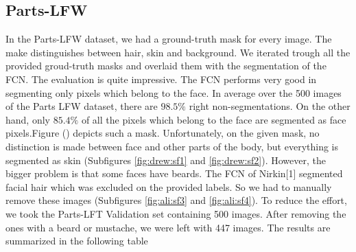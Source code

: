 \newpage

\subsection{Parts-LFW}
In the Parts-LFW dataset, we had a ground-truth mask for every image. The make distinguishes between hair, skin and background. We iterated trough all the provided groud-truth masks and overlaid them with the segmentation of the FCN. The evaluation is quite impressive. The FCN performs very good in segmenting only pixels which belong to the face. In average over the 500 images of the Parts LFW dataset, there are $98.5\%$ right non-segmentations. On the other hand, only $85.4\%$ of all the pixels which belong to the face are segmented as face pixels.Figure (\todo) depicts such a mask. Unfortunately, on the given mask, no distinction is made between face and other parts of the body, but everything is segmented as skin (Subfigures \ref{fig:drew:sf1} and \ref{fig:drew:sf2}). However, the bigger problem is that some faces have beards. The FCN of Nirkin[1] segmented facial hair which was excluded on the provided labels. So we had to manually remove these images (Subfigures \ref{fig:ali:sf3} and \ref{fig:ali:sf4}). To reduce the effort, we took the Parts-LFT Validation set containing 500 images. After removing the ones with a beard or mustache, we were left with 447 images. The results are summarized in the following table\\
\\
